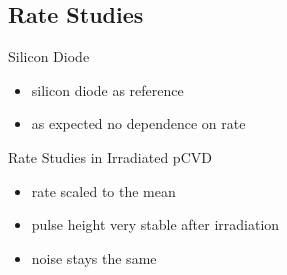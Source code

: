 \subsection{Rate Studies}
\begin{frame}{Silicon Diode}

	
	\begin{itemize}\itemfill
		\item silicon diode as reference 
		\item as expected no dependence on rate
	\end{itemize}
	
\end{frame}
%  
% 	
%  
\begin{frame}{Rate Studies in Irradiated pCVD}

	\vspace*{-15pt}
	
	\begin{itemize}\itemfill
		\item rate scaled to the mean
		\item pulse height very stable after irradiation
		\item noise stays the same
	\end{itemize}

\end{frame}
